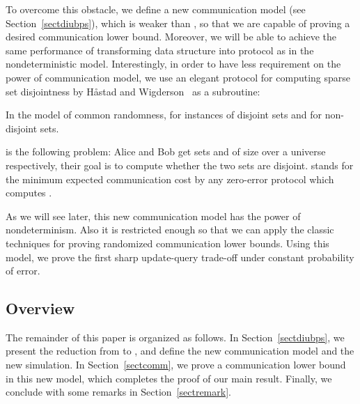 \documentclass[11pt]{article}
\begin{document}
To overcome this obstacle, we define a new communication model (see Section~\ref{sectdiubps}), which is weaker than , so that we are capable of proving a desired communication lower bound. Moreover, we will be able to achieve the same performance of transforming data structure into protocol as in the nondeterministic model. Interestingly, in order to have less requirement on the power of communication model, we use an elegant protocol for computing sparse set disjointness by H\aa{}stad and Wigderson~\cite{HW07} as a subroutine:

\begin{theorem}\label{thmsparse}
In the model of common randomness,  for instances of disjoint sets and  for non-disjoint sets.
\end{theorem}

 is the following problem: Alice and Bob get sets  and  of size  over a universe  respectively, their goal is to compute whether the two sets are disjoint.  stands for the minimum expected communication cost by any zero-error protocol which computes . 

As we will see later, this new communication model has the power of nondeterminism. Also it is restricted enough so that we can apply the classic techniques for proving randomized communication lower bounds. Using this model, we prove the first sharp update-query trade-off under constant probability of error. 

\subsection{Overview}
The remainder of this paper is organized as follows. In Section~\ref{sectdiubps}, we present the reduction from \bps{} to \diu{}, and define the new communication model and the new simulation. In Section~\ref{sectcomm}, we prove a communication lower bound in this new model, which completes the proof of our main result. \iftoggle{conf}{Some proof details and the applications of our main theorem to dynamic graph problems can be found in the full version. }{In Section~\ref{sectapp}, we apply the main theorem to several dynamic graph problems. }Finally, we conclude with some remarks in Section~\ref{sectremark}.
\end{document}
